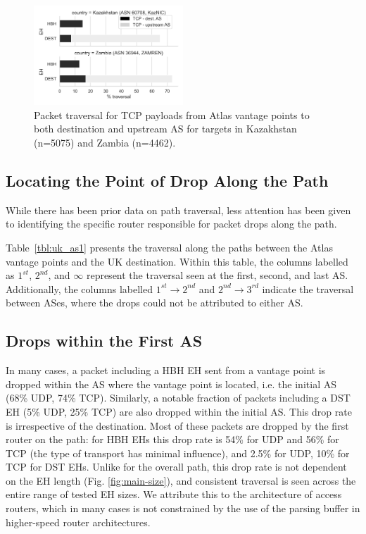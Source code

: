 \documentclass[conference]{IEEEtran}
\begin{document}

\begin{figure}
\centering
  \includegraphics[width=0.5\textwidth]{traversal-pathologies.png}
  \caption{Packet traversal for TCP payloads from Atlas vantage points to both destination and upstream
AS for targets in Kazakhstan (n=5075) and Zambia (n=4462).}
  \label{fig:traversal_pathologies}
\end{figure}

\subsection{Locating the Point of Drop Along the Path}

While there has been prior data on path traversal, less attention has been
given to identifying the specific router responsible for packet drops along the
path.

Table~\ref{tbl:uk_as1} presents the traversal along the
paths between the Atlas vantage points and the UK destination.
Within this table, the columns labelled as $1^{st}$, $2^{nd}$, and $\infty$
represent the traversal seen at the first, second, and last AS.
Additionally, the columns labelled $1^{st}\rightarrow 2^{nd}$ and
$2^{nd}\rightarrow 3^{rd}$ indicate the traversal
between ASes, where the drops could not be attributed to either AS.
\subsection{Drops within the First AS}
\label{subsec: asdrop}

In many cases, a packet including a HBH EH sent from a vantage point is dropped within the AS where the vantage point is located, i.e. the initial AS (68\% UDP, 74\% TCP). Similarly, a notable fraction of packets including a DST EH (5\% UDP, 25\% TCP) are also dropped within the
initial AS. This drop rate is irrespective of the destination.
Most of these packets are dropped by the first router on the path: for HBH EHs this drop rate is 54\% for UDP and 56\% for TCP (the type of transport has minimal influence), and 2.5\% for UDP, 10\% for TCP for DST EHs.
Unlike for the overall path, this drop rate is not dependent on the EH length (Fig. \ref{fig:main-size}), and consistent traversal is seen across the entire range of tested EH sizes. We attribute this to the architecture of access routers, which in many cases is not constrained by the use of the parsing buffer in higher-speed router architectures.
\end{document}

